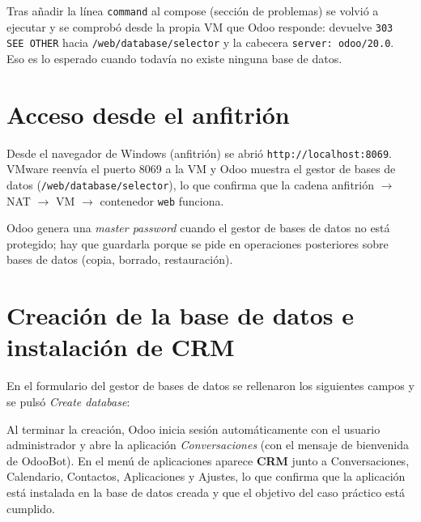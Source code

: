 
Tras a\~nadir la l\'inea \texttt{command} al compose (secci\'on de problemas) se volvi\'o a ejecutar  y se comprob\'o desde la propia VM que Odoo responde:  devuelve \texttt{303 SEE OTHER} hacia \texttt{/web/database/selector} y la cabecera \texttt{server: odoo/20.0}. Eso es lo esperado cuando todav\'ia no existe ninguna base de datos.


\section{Acceso desde el anfitri\'on}
Desde el navegador de Windows (anfitri\'on) se abri\'o \texttt{http://localhost:8069}. VMware reenv\'ia el puerto 8069 a la VM y Odoo muestra el gestor de bases de datos (\texttt{/web/database/selector}), lo que confirma que la cadena anfitri\'on $\to$ NAT $\to$ VM $\to$ contenedor \texttt{web} funciona.


Odoo genera una \emph{master password} cuando el gestor de bases de datos no est\'a protegido; hay que guardarla porque se pide en operaciones posteriores sobre bases de datos (copia, borrado, restauraci\'on).

\section{Creaci\'on de la base de datos e instalaci\'on de CRM}
En el formulario del gestor de bases de datos se rellenaron los siguientes campos y se puls\'o \emph{Create database}:



Al terminar la creaci\'on, Odoo inicia sesi\'on autom\'aticamente con el usuario administrador y abre la aplicaci\'on \emph{Conversaciones} (con el mensaje de bienvenida de OdooBot). En el men\'u de aplicaciones aparece \textbf{CRM} junto a Conversaciones, Calendario, Contactos, Aplicaciones y Ajustes, lo que confirma que la aplicaci\'on est\'a instalada en la base de datos creada y que el objetivo del caso pr\'actico est\'a cumplido.

